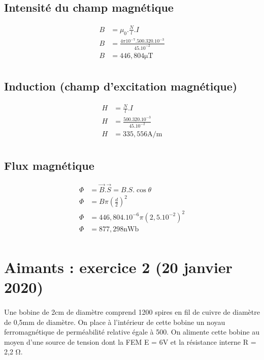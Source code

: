 \documentclass{article}
\begin{document}
\subsection{Intensité du champ magnétique}
\begin{align*}
    B &= \mu_0.\frac{N}{l}.I\\
    B &= \frac{4 \pi 10^{-7}.500.320.10^{-3}}{45.10^{-2}}\\
    B &= 446,804 \si{\micro\tesla}\\
\end{align*}

\subsection{Induction (champ d'excitation magnétique)}
\begin{align*}
    H &= \frac{N}{l}.I\\
    H &= \frac{500.320.10^{-3}}{45.10^{-2}}\\
    H &= 335,556 \si{\ampere}/\si{\meter}\\
\end{align*}

\subsection{Flux magnétique}
\begin{align*}
    \Phi &= \overrightarrow{B}.\overrightarrow{S} = B.S.\cos\theta\\
    \Phi &= B\pi\left(\frac{d}{2}\right)^2\\
    \Phi &= 446,804.10^{-6}\pi\left(2,5.10^{-2}\right)^2\\
    \Phi &= 877,298 \si{\nano\weber}\\
\end{align*}

\newpage
\section{Aimants : exercice 2 (20 janvier 2020)}
\paragraph{}
Une bobine de 2cm de diamètre comprend 1200 spires en fil de cuivre de diamètre de 0,5mm de diamètre. On place à l'intérieur de cette bobine un noyau ferromagnétique de perméabilité relative égale à 500. On alimente cette bobine au moyen d'une source de tension dont la FEM E = 6V et la résistance interne R = 2,2 \si{\ohm}.
\end{document}
